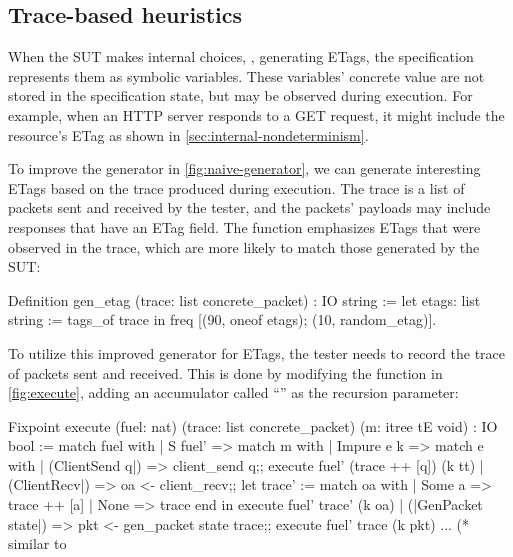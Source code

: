 \subsection{Trace-based heuristics}
\label{sec:heuristic-trace}

When the SUT makes internal choices, \eg, generating ETags, the
specification represents them as symbolic variables.  These variables' concrete
value are not stored in the specification state, but may be observed during
execution.  For example, when an HTTP server responds to a GET request, it might
include the resource's ETag as shown in \autoref{sec:internal-nondeterminism}.

To improve the generator in \autoref{fig:naive-generator}, we can generate
interesting ETags based on the trace produced during execution.  The trace is a
list of packets sent and received by the tester, and the packets' payloads may
include responses that have an ETag field.  The  function
emphasizes ETags that were observed in the trace, which are more likely to match
those generated by the SUT:
\begin{coq}
  Definition gen_etag (trace: list concrete_packet) : IO string :=
    let etags: list string := tags_of trace in
    freq [(90, oneof etags);
          (10, random_etag)].
\end{coq}

To utilize this improved generator for ETags, the tester needs to record the
trace of packets sent and received.  This is done by modifying the 
function in \autoref{fig:execute}, adding an accumulator called ``''
as the recursion parameter:
\begin{coq}
  Fixpoint execute (fuel: nat) (trace: list concrete_packet)
                   (m: itree tE void) : IO bool :=
    match fuel with
    | S fuel' =>
      match m with
      | Impure e k =>
        match e with
        | (ClientSend q|) => client_send q;;
                             execute fuel' (trace ++ [q]) (k tt)
        | (ClientRecv|)   => oa <- client_recv;;                             
                             let trace' := match oa with
                                           | Some a => trace ++ [a]
                                           | None   => trace
                                           end in
                             execute fuel' trace' (k oa)
        | (|GenPacket state|) => pkt <- gen_packet state trace;;
                                 execute fuel' trace (k pkt)
        ... (* similar to %
\end{coq}

